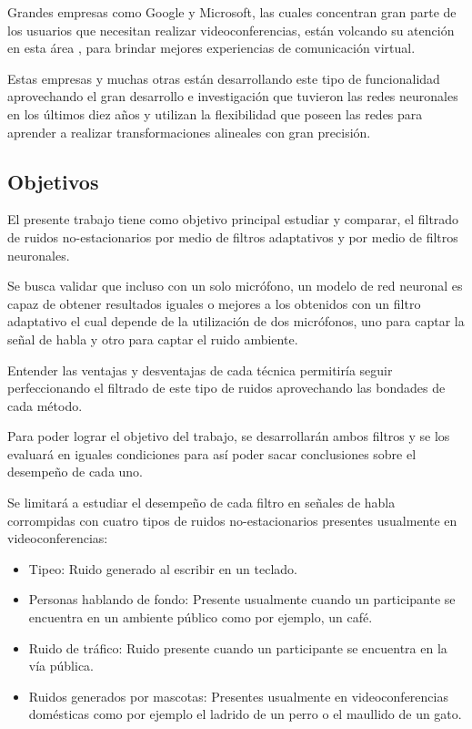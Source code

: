 Grandes empresas como Google y Microsoft, las cuales concentran gran parte de los usuarios que necesitan realizar videoconferencias, están volcando su atención en esta área \cite{interspeech_2020,google_noise_filter}, para brindar mejores experiencias de comunicación virtual.

Estas empresas y muchas otras están desarrollando este tipo de funcionalidad aprovechando el gran desarrollo e investigación que tuvieron las redes neuronales en los últimos diez años y utilizan la flexibilidad que poseen las redes para aprender a realizar transformaciones alineales con gran precisión.

\subsection{Objetivos}
\label{sec:objetivos}

El presente trabajo tiene como objetivo principal estudiar y comparar, el filtrado de ruidos no-estacionarios por medio de filtros adaptativos y por medio de filtros neuronales. 

Se busca validar que incluso con un solo micrófono, un modelo de red neuronal es capaz de obtener resultados iguales o mejores a los obtenidos con un filtro adaptativo el cual depende de la utilización de dos micrófonos, uno para captar la señal de habla y otro para captar el ruido ambiente.

Entender las ventajas y desventajas de cada técnica permitiría seguir perfeccionando el filtrado de este tipo de ruidos aprovechando las bondades de cada método.

Para poder lograr el objetivo del trabajo, se desarrollarán ambos filtros y se los evaluará en iguales condiciones para así poder sacar conclusiones sobre el desempeño de cada uno.

Se limitará a estudiar el desempeño de cada filtro en señales de habla corrompidas con cuatro tipos de  ruidos no-estacionarios presentes usualmente en videoconferencias:

\begin{itemize}
	\item Tipeo: Ruido generado al escribir en un teclado.
	\item Personas hablando de fondo: Presente usualmente cuando un participante se encuentra en un ambiente público como por ejemplo, un café.
	\item Ruido de tráfico: Ruido presente cuando un participante se encuentra en la vía pública.
	\item Ruidos generados por mascotas: Presentes usualmente en videoconferencias domésticas como por ejemplo el ladrido de un perro o el maullido de un gato.
\end{itemize}

